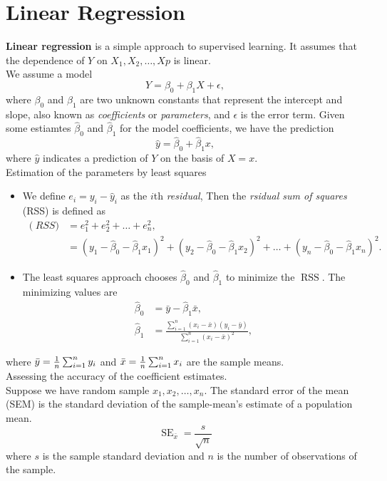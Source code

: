 \documentclass[11pt, a4paper]{article}
\begin{document}
\section{Linear Regression}
\textbf{Linear regression} is a simple approach to supervised learning. It assumes that the dependence of $Y$ on $X_1,X_2,\dots,Xp$ is linear.\\
We assume a model
\[
Y=\beta_0+\beta_1 X + \epsilon,
\]
where $\beta_0$ and $\beta_1$ are two unknown constants that represent the intercept and slope, also known as \emph{coefficients} or \emph{parameters}, and $\epsilon$ is the error term.
Given some estiamtes $\hat{\beta}_0$ and $\hat{\beta}_1$ for the model coefficients, we have the prediction
\[
  \hat{y}=\hat{\beta}_0+\hat{\beta}_1 x,
\]
where $\hat{y}$ indicates a prediction of $Y$ on the basis of $X=x$.\\
Estimation of the parameters by least squares
\begin{itemize}
\item We define $e_i=y_i-\hat{y}_i$ as the $i$th \emph{residual}, Then the \emph{rsidual sum of squares} (RSS) is defined as
\begin{align}
\operatorname(RSS)&=e^2_1+e^2_2+\dots+e^2_n,\\
&=(y_1-\hat{\beta}_0-\hat{\beta}_1x_1)^2+(y_2-\hat{\beta}_0-\hat{\beta}_1x_2)^2+\dots+(y_n-\hat{\beta}_0-\hat{\beta}_1x_n)^2.
\end{align}
\item The least squares approach chooses $\hat{\beta}_0$ and $\hat{\beta}_1$ to minimize the $\operatorname{RSS}$. The minimizing values are 
  \begin{align}
  \hat{\beta}_0&=\bar{y}-\hat{\beta}_1 \bar{x},\\
    \hat{\beta}_1&=\frac{\sum_{i=1}^n(x_i-\bar{x})(y_i-\bar{y})}{\sum_{i=1}^n(x_i-\bar{x})^2},
  \end{align}
\end{itemize}
where $\bar{y}={1\over n}\sum_{i=1}^n y_i$ and $\bar{x}={1\over n}\sum_{i=1}^n x_i$ are the sample means.\\
Assessing the accuracy of the coefficient estimates.\\
Suppose we have random sample $x_1,x_2,\dots,x_n$. The standard error of the mean (SEM) is the standard deviation of the sample-mean's estimate of a population mean.
\[
  \operatorname{SE}_{\bar{x}}=\frac{s}{\sqrt{n}}
\]
where $s$ is the sample standard deviation and $n$ is the number of observations of the sample.\\
\end{document}
